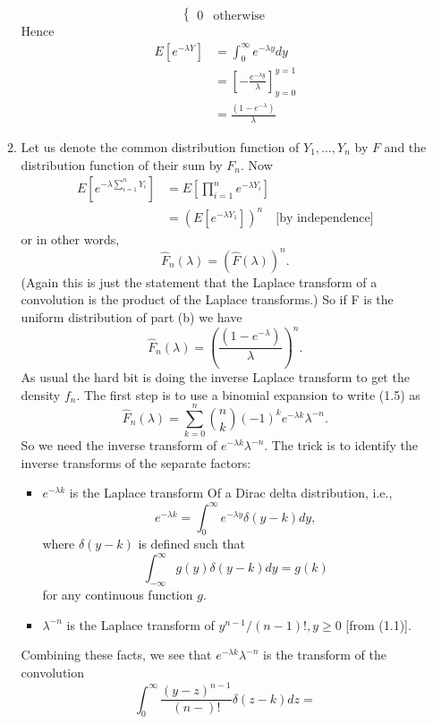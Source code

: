 \documentclass[11pt,a4paper]{article}
\begin{document}
\begin{enumerate}
\begin{enumerate}
$$\begin{cases}
        0 & \text{otherwise}
      \end{cases}
      $$
      Hence
      \begin{align*}
        E[e^{-\lambda Y}]
        &= \int_0^\infty e^{-\lambda y}dy\\
        &= \left[-\frac{e^{-\lambda y}}{\lambda}\right]^{y = 1}_{y = 0}\\
        &= \frac{(1 - e^{-\lambda})}{\lambda}
      \end{align*}
      \item Let us denote the common distribution function of $Y_1, \ldots, Y_n$ by $F$ and the distribution
      function of their sum by $F_n$. Now
      \begin{align*}
        E\left[e^{-\lambda\sum_{i=1}^nY_i}\right]
        &= E\left[\prod_{i = 1}^ne^{-\lambda Y_i}\right]\\
        &= \left(E[e^{-\lambda Y_1}]\right)^n \quad\text{[by independence]}
      \end{align*}
      or in other words,
      $$
      \hat{F}_n(\lambda) = (\hat{F}(\lambda))^n.
      $$
      (Again this is just the statement that the Laplace transform of a convolution is the product of the Laplace transforms.) So if F is the uniform distribution of part (b) we have
      $$
      \hat{F}_n(\lambda) = \left(\frac{(1 - e^{-\lambda})}{\lambda}\right)^n.
      $$
      As usual the hard bit is doing the inverse Laplace transform to get the density $f_n$. The first step is to use a binomial expansion to write (1.5) as
      $$
      \hat{F}_n(\lambda) = \sum_{k = 0}^n\binom{n}{k}(-1)^ke^{-\lambda k}\lambda^{-n}.
      $$
      So we need the inverse transform of $e^{-\lambda k}\lambda^{-n}$. The trick is to identify the inverse transforms of the separate factors:
      \begin{itemize}
        \item $e^{-\lambda k}$ is the Laplace transform Of a Dirac delta distribution, i.e.,
        $$
        e^{-\lambda k} = \int_0^\infty e^{-\lambda y}\delta(y - k)dy,
        $$
        where $\delta(y - k)$ is defined such that
        $$
        \int_{-\infty}^\infty g(y)\delta(y - k)dy = g(k)
        $$
        for any continuous function $g$.
        \item $\lambda^{-n}$ is the Laplace transform of $y^{n - 1}/(n - 1)!, y \geq 0$ [from (1.1)].
      \end{itemize}
      Combining these facts, we see that $e^{-\lambda k}\lambda^{-n}$ is the transform of the convolution
      $$
      \int_0^\infty \frac{(y - z)^{n - 1}}{(n - )!}\delta(z - k)dz =
$$
\end{enumerate}
\end{enumerate}
\end{document}
